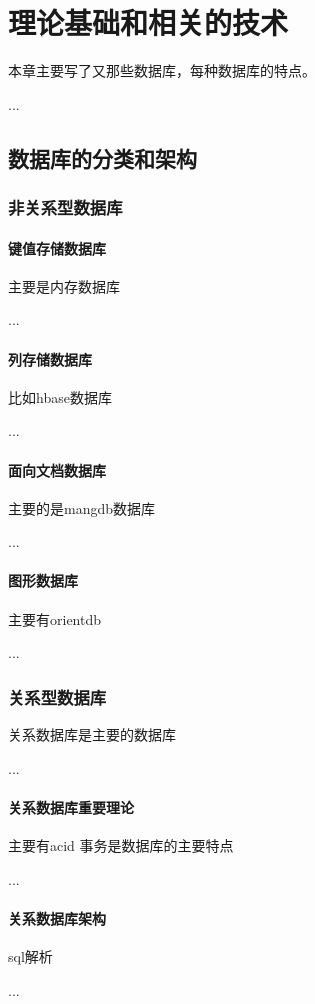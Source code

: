 
\chapter{理论基础和相关的技术}
本章主要写了又那些数据库，每种数据库的特点。

...
\section{数据库的分类和架构}

\subsection{非关系型数据库}

\subsubsection*{键值存储数据库}
主要是内存数据库

...
\subsubsection*{列存储数据库}
比如hbase数据库

...
\subsubsection*{面向文档数据库}
主要的是mangdb数据库

...
\subsubsection*{图形数据库}
主要有orientdb

...
\subsection{关系型数据库}
关系数据库是主要的数据库

...
\subsubsection{关系数据库重要理论}
主要有acid
事务是数据库的主要特点

...
\subsubsection{关系数据库架构}
sql解析

...

